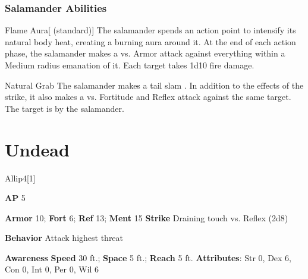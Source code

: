 \subsubsection{Salamander Abilities}

\begin{ability}{Flame Aura}[ (standard)]
The salamander spends an action point to intensify its natural body heat, creating a burning aura around it.
At the end of each action phase, the salamander makes a  vs. Armor
attack against everything within a Medium radius emanation of it.
\hit Each target takes 1d10 fire damage.
\end{ability}

\vspace{0.5em}
\begin{ability}{Natural Grab}
The salamander makes a tail slam .
In addition to the effects of the strike, it also makes a  vs. Fortitude and Reflex attack against the same target.
\hit The target is  by the salamander.
\end{ability}

\section{Undead}
\begin{monsection}{Allip}{4}[1]
\vspace{-1em}\vspace{-1em}
\begin{spellcontent}
\begin{spelltargetinginfo}
{\textbf{AP} 5}

\pari \textbf{Armor} 10;
\textbf{Fort} 6;
\textbf{Ref} 13;
\textbf{Ment} 15
\pari \textbf{Strike} Draining touch  vs. Reflex (2d8)



\pari \textbf{Behavior} Attack highest threat
\end{spelltargetinginfo}
\end{spellcontent}

\begin{monsterfooter}
\pari \textbf{Awareness} 
\pari \textbf{Speed} 30 ft.;
\textbf{Space} 5 ft.;
\textbf{Reach} 5 ft.
\pari \textbf{Attributes}:
Str 0,
Dex 6,
Con 0,
Int 0,
Per 0,
Wil 6
\end{monsterfooter}
\end{monsection}

